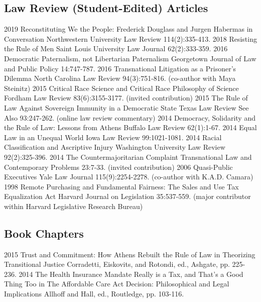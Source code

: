 \documentclass[letterpaper]{moderncv}
\begin{document}
\subsection{Law Review (Student-Edited) Articles}
\cventry
{2019}
{Reconstituting We the People: Frederick Douglass and Jurgen Habermas in Conversation}
{}
{Northwestern University Law Review}
{}
{114(2):335-413. }
\vspace{1mm}
\cventry
{2018}
{Resisting the Rule of Men}
{}
{Saint Louis University Law Journal}
{}
{62(2):333-359. }
\vspace{1mm}
\cventry
{2016}
{Democratic Paternalism, not Libertarian Paternalism}
{}
{Georgetown Journal of Law and Public Policy}
{}
{14:747-787. }
\vspace{1mm}
\cventry
{2016}
{Transnational Litigation as a Prisoner's Dilemma}
{}
{North Carolina Law Review}
{}
{94(3):751-816. (co-author with Maya Steinitz)}
\vspace{1mm}
\cventry
{2015}
{Critical Race Science and Critical Race Philosophy of Science}
{}
{Fordham Law Review}
{}
{83(6):3155-3177. (invited contribution)}
\vspace{1mm}
\cventry
{2015}
{The Rule of Law Against Sovereign Immunity in a Democratic State}
{}
{Texas Law Review See Also}
{}
{93:247-262. (online law review commentary)}
\vspace{1mm}
\cventry
{2014}
{Democracy, Solidarity and the Rule of Law: Lessons from Athens}
{}
{Buffalo Law Review}
{}
{62(1):1-67. }
\vspace{1mm}
\cventry
{2014}
{Equal Law in an Unequal World}
{}
{Iowa Law Review}
{}
{99:1021-1081. }
\vspace{1mm}
\cventry
{2014}
{Racial Classification and Ascriptive Injury}
{}
{Washington University Law Review}
{}
{92(2):325-396. }
\vspace{1mm}
\cventry
{2014}
{The Countermajoritarian Complaint}
{}
{Transnational Law and Contemporary Problems}
{}
{23:7-33. (invited contribution)}
\vspace{1mm}
\cventry
{2006}
{Quasi-Public Executives}
{}
{Yale Law Journal}
{}
{115(9):2254-2278. (co-author with K.A.D. Camara)}
\vspace{1mm}
\cventry
{1998}
{Remote Purchasing and Fundamental Fairness: The Sales and Use Tax Equalization Act}
{}
{Harvard Journal on Legislation}
{}
{35:537-559. (major contributor within Harvard Legislative Research Bureau)}
\vspace{1mm}
\vspace{1mm}
\subsection{Book Chapters}
\cventry
{2015}
{Trust and Commitment: How Athens Rebuilt the Rule of Law}
{}
{in Theorizing Transitional Justice}
{}
{Corradetti, Eiskovits, and Rotondi, ed., Ashgate, pp. 225-236.}
\vspace{1mm}
\cventry
{2014}
{The Health Insurance Mandate Really is a Tax, and That's a Good Thing Too}
{}
{in The Affordable Care Act Decision: Philosophical and Legal Implications}
{}
{Allhoff and Hall, ed., Routledge, pp. 103-116.}
\vspace{1mm}
\vspace{1mm}
\end{document}
